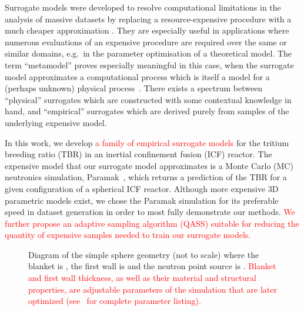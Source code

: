 Surrogate models were developed to resolve computational limitations in the analysis of massive datasets by replacing a resource-expensive procedure with a much cheaper approximation
\cite{Sondergaard2003}. They are especially useful in applications where
numerous evaluations of an expensive procedure are required over the same or
similar domains, e.g.~in the parameter optimisation of a theoretical model. The
term ``metamodel'' proves especially meaningful in this case, when the surrogate
model approximates a computational process which is itself a model for a
(perhaps unknown) physical process~\cite{Myers2002}. There exists a spectrum
between ``physical'' surrogates which are constructed with some contextual
knowledge in hand, and ``empirical'' surrogates which are derived purely from
samples of the underlying expensive model.

In this work, we develop \textcolor{red}{a family of empirical surrogate models} for the tritium breeding
ratio (TBR) in an inertial confinement fusion (ICF) reactor. The expensive model
that our surrogate model approximates is a Monte Carlo (MC) neutronics
simulation, Paramak~\cite{paramak}, which returns a prediction of the TBR for a given
configuration of a spherical ICF reactor. Although more expensive 3D parametric models exist, we chose the Paramak simulation for its preferable speed in dataset generation in order to most fully demonstrate our methods. \textcolor{red}{We further propose an adaptive sampling algorithm (QASS) suitable for reducing the quantity of expensive samples needed to train our surrogate models.}

\begin{figure}[!ht]
  \centering

    \caption{Diagram of the simple sphere geometry (not to scale) where the
	blanket is , the
first wall is  and the
neutron point source is . \textcolor{red}{
Blanket and first wall thickness, as well as their material and structural
properties, are adjustable parameters of the simulation that are later optimized
(see~ for complete parameter listing).}}
    \label{fig:model_diagram}
\end{figure}

